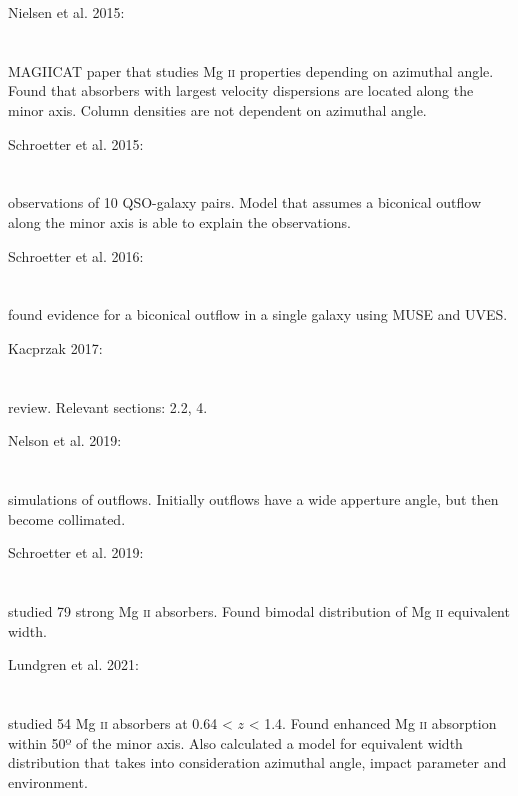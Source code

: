 \hline

Nielsen et al. 2015: \\
\citet{2015ApJ...812...83N} \\
\citep{2015ApJ...812...83N} \\
MAGIICAT paper that studies Mg \textsc{ii} properties depending on azimuthal
angle. Found that absorbers with largest velocity dispersions are located along
the minor axis. Column densities are not dependent on azimuthal angle. \\

\hline

Schroetter et al. 2015: \\
\citet{2015ApJ...804...83S} \\
\citep{2015ApJ...804...83S} \\
observations of 10 QSO-galaxy pairs. Model that assumes a biconical outflow
along the minor axis is able to explain the observations. \\

\hline

Schroetter et al. 2016: \\
\citet{2016ApJ...833...39S} \\
\citep{2016ApJ...833...39S} \\
found evidence for a biconical outflow in a single galaxy using MUSE and
UVES. \\

\hline

Kacprzak 2017: \\
\citet{2017ASSL..430..145K} \\
\citep{2017ASSL..430..145K} \\
review. Relevant sections: 2.2, 4. \\

\hline

Nelson et al. 2019: \\
\citet{2019MNRAS.490.3234N} \\
\citep{2019MNRAS.490.3234N} \\
simulations of outflows. Initially outflows have a wide apperture angle, but
then become collimated. \\

\hline

Schroetter et al. 2019: \\
\citet{2019MNRAS.490.4368S} \\
\citep{2019MNRAS.490.4368S} \\
studied 79 strong Mg \textsc{ii} absorbers. Found bimodal distribution of
Mg \textsc{ii} equivalent width. \\

\hline

Lundgren et al. 2021: \\
\citet{2021ApJ...913...50L} \\
\citep{2021ApJ...913...50L} \\
studied 54 Mg \textsc{ii} absorbers at 0.64 < $z$ < 1.4. Found enhanced
Mg \textsc{ii} absorption within 50º of the minor axis. Also calculated a model
for equivalent width distribution that takes into consideration azimuthal angle,
impact parameter and environment.
